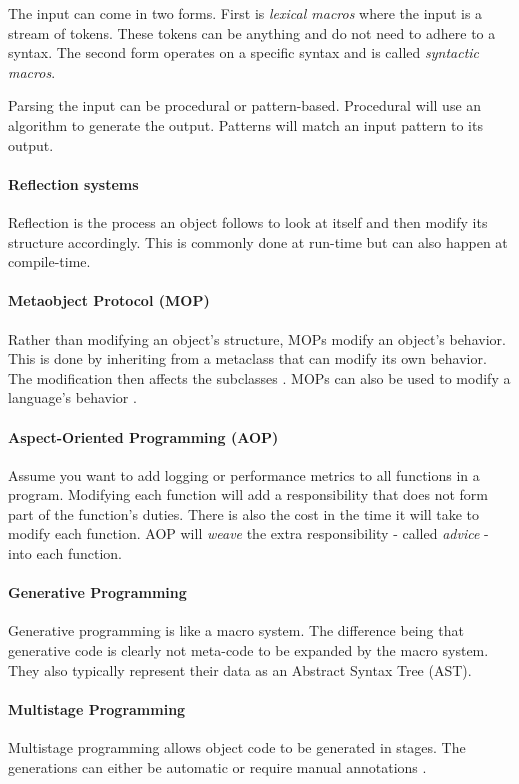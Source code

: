 The input can come in two forms.
First is \textit{lexical macros} where the input is a stream of tokens.
These tokens can be anything and do not need to adhere to a syntax.
The second form operates on a specific syntax and is called \textit{syntactic macros}.

Parsing the input can be procedural or pattern-based.
Procedural will use an algorithm to generate the output.
Patterns will match an input pattern to its output.

\paragraph{Reflection systems}
Reflection is the process an object follows to look at itself and then modify its structure accordingly.
This is commonly done at run-time but can also happen at compile-time.

\paragraph{Metaobject Protocol (MOP)}
Rather than modifying an object's structure, MOPs modify an object's behavior.
This is done by inheriting from a metaclass that can modify its own behavior.
The modification then affects the subclasses \cite{lee_95_01}.
MOPs can also be used to modify a language's behavior \cite{seaton_15_01}.

\paragraph{Aspect-Oriented Programming (AOP)}
Assume you want to add logging or performance metrics to all functions in a program.
Modifying each function will add a responsibility that does not form part of the function's duties.
There is also the cost in the time it will take to modify each function.
AOP will \textit{weave} the extra responsibility - called \textit{advice} - into each function.

\paragraph{Generative Programming}
Generative programming is like a macro system.
The difference being that generative code is clearly not meta-code to be expanded by the macro system.
They also typically represent their data as an Abstract Syntax Tree (AST). 

\paragraph{Multistage Programming}
Multistage programming allows object code to be generated in stages.
The generations can either be automatic or require manual annotations \cite{sheard_01_01, taha_04_01}.

